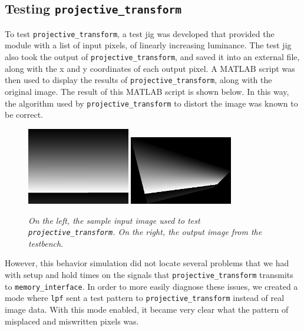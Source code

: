 \documentclass[10pt]{article}
\begin{document}
\subsection{Testing {\tt projective\_transform}}

To test {\tt projective\_transform}, a test jig was developed that provided the module with a list of input pixels, of linearly increasing luminance. The test jig also took the output of {\tt projective\_transform}, and saved it into an external file, along with the x and y coordinates of each output pixel. A MATLAB script was then used to display the results of {\tt projective\_transform}, along with the original image. The result of this MATLAB script is shown below. In this way, the algorithm used by {\tt projective\_transform} to distort the image was known to be correct.

\begin{figure}[h!]
\centering
\includegraphics[width=0.4\textwidth]{images/original.png}
\includegraphics[width=0.4\textwidth]{images/output.png}
\caption{\emph{On the left, the sample input image used to test {\tt projective\_transform}. On the right, the output image from the testbench.}}
\end{figure}

However, this behavior simulation did not locate several problems that we had with setup and hold times on the signals that {\tt projective\_transform} transmits to {\tt memory\_interface}. In order to more easily diagnose these issues, we created a mode where {\tt lpf} sent a test pattern to {\tt projective\_transform} instead of real image data. With this mode enabled, it became very clear what the pattern of misplaced and miswritten pixels was.
\end{document}
